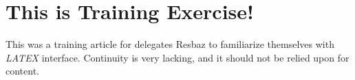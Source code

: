\section{This is Training Exercise!}
This was a training article for delegates Resbaz to familiarize themselves with \textit{LATEX} interface. 
Continuity is very lacking, and it should not be relied upon for content. 